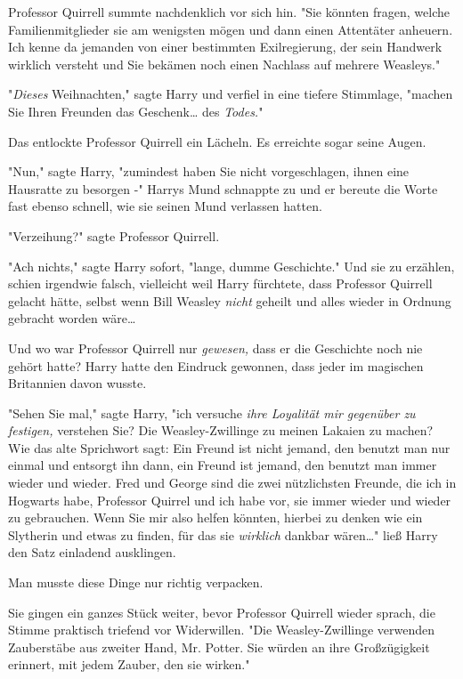 {Professor Quirrell summte nachdenklich vor sich hin. "Sie könnten fragen, welche Familienmitglieder sie am wenigsten mögen und dann einen Attentäter anheuern. Ich kenne da jemanden von einer bestimmten Exilregierung, der sein Handwerk wirklich versteht und Sie bekämen noch einen Nachlass auf mehrere Weasleys."

"\emph{Dieses} Weihnachten," sagte Harry und verfiel in eine tiefere Stimmlage, "machen Sie Ihren Freunden das Geschenk… des \emph{Todes.}"

Das entlockte Professor Quirrell ein Lächeln. Es erreichte sogar seine Augen.

"Nun," sagte Harry, "zumindest haben Sie nicht vorgeschlagen, ihnen eine Hausratte zu besorgen -" Harrys Mund schnappte zu und er bereute die Worte fast ebenso schnell, wie sie seinen Mund verlassen hatten.

"Verzeihung?" sagte Professor Quirrell.

"Ach nichts," sagte Harry sofort, "lange, dumme Geschichte." Und sie zu erzählen, schien irgendwie falsch, vielleicht weil Harry fürchtete, dass Professor Quirrell gelacht hätte, selbst wenn Bill Weasley \emph{nicht} geheilt und alles wieder in Ordnung gebracht worden wäre…

Und wo war Professor Quirrell nur \emph{gewesen,} dass er die Geschichte noch nie gehört hatte? Harry hatte den Eindruck gewonnen, dass jeder im magischen Britannien davon wusste.

"Sehen Sie mal," sagte Harry, "ich versuche \emph{ihre Loyalität mir gegenüber zu festigen,} verstehen Sie? Die Weasley-Zwillinge zu meinen Lakaien zu machen? Wie das alte Sprichwort sagt: Ein Freund ist nicht jemand, den benutzt man nur einmal und entsorgt ihn dann, ein Freund ist jemand, den benutzt man immer wieder und wieder. Fred und George sind die zwei nützlichsten Freunde, die ich in Hogwarts habe, Professor Quirrel und ich habe vor, sie immer wieder und wieder zu gebrauchen. Wenn Sie mir also helfen könnten, hierbei zu denken wie ein Slytherin und etwas zu finden, für das sie \emph{wirklich} dankbar wären…" ließ Harry den Satz einladend ausklingen.

Man musste diese Dinge nur richtig verpacken.

Sie gingen ein ganzes Stück weiter, bevor Professor Quirrell wieder sprach, die Stimme praktisch triefend vor Widerwillen. "Die Weasley-Zwillinge verwenden Zauberstäbe aus zweiter Hand, Mr. Potter. Sie würden an ihre Großzügigkeit erinnert, mit jedem Zauber, den sie wirken."

}
